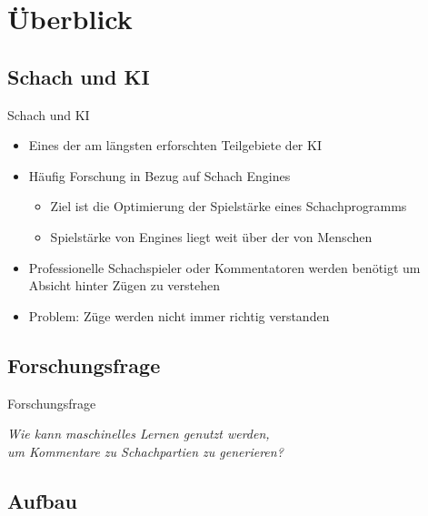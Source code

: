 \section{Überblick}

\subsection{Schach und KI}

\begin{frame}{Schach und KI}
\begin{itemize}
	\item Eines der am längsten erforschten Teilgebiete der KI
	\item Häufig Forschung in Bezug auf Schach Engines
	\begin{itemize}
		\item Ziel ist die Optimierung der Spielstärke eines Schachprogramms
		\item Spielstärke von Engines liegt weit über der von Menschen
	\end{itemize}
	\item Professionelle Schachspieler oder Kommentatoren werden benötigt um Absicht hinter Zügen zu verstehen
	\item Problem: Züge werden nicht immer richtig verstanden
\end{itemize}
\end{frame}

\subsection{Forschungsfrage}

\begin{frame}{Forschungsfrage}
\begin{center}
\begin{large}
\textit{Wie kann maschinelles Lernen genutzt werden,\\um Kommentare zu Schachpartien zu generieren?}
\end{large}
\end{center}
\end{frame}

\subsection{Aufbau}

